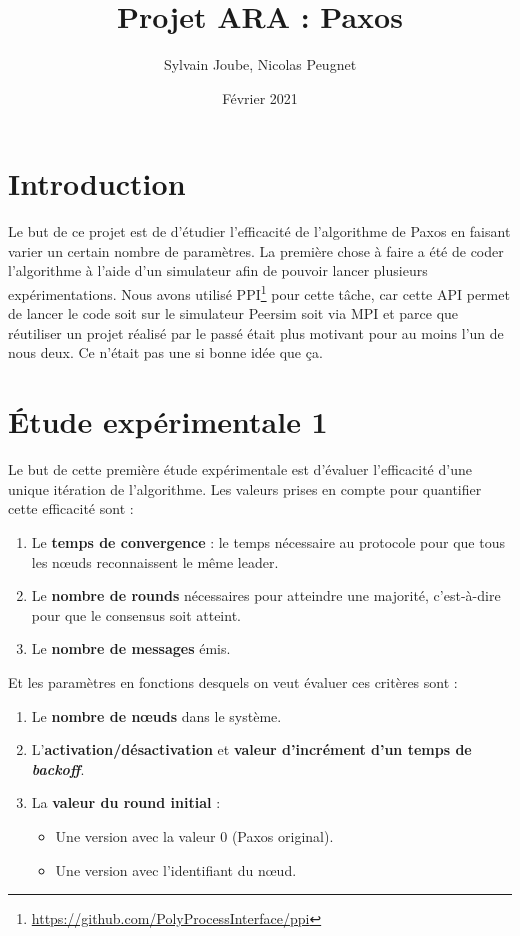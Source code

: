\documentclass[french]{article}
\title{Projet ARA : Paxos}
\date{Février 2021}
\author{Sylvain Joube, Nicolas Peugnet}
\begin{document}
\maketitle

\tableofcontents

\section*{Introduction}

Le but de ce projet est de d'étudier l'efficacité de l'algorithme de Paxos en faisant varier un certain nombre de paramètres.
La première chose à faire a été de coder l'algorithme à l'aide d'un simulateur afin de pouvoir lancer plusieurs expérimentations.
Nous avons utilisé PPI\footnote{\url{https://github.com/PolyProcessInterface/ppi}} pour cette tâche,
car cette API permet de lancer le code soit sur le simulateur Peersim soit via MPI et parce que réutiliser un projet réalisé par le passé était plus motivant pour au moins l'un de nous deux.
Ce n'était pas une si bonne idée que ça.

\section{Étude expérimentale 1}

Le but de cette première étude expérimentale est d'évaluer l'efficacité d'une unique itération de l'algorithme.
Les valeurs prises en compte pour quantifier cette efficacité sont :

\begin{enumerate}
	\item Le \textbf{temps de convergence} : le temps nécessaire au protocole pour que tous les nœuds reconnaissent le même leader.
	\item Le \textbf{nombre de rounds} nécessaires pour atteindre une majorité, c’est-à-dire pour que le consensus soit atteint.
	\item Le \textbf{nombre de messages} émis.
\end{enumerate}

Et les paramètres en fonctions desquels on veut évaluer ces critères sont :

\begin{enumerate}
	\item Le \textbf{nombre de nœuds} dans le système.
	\item L'\textbf{activation/désactivation} et \textbf{valeur d'incrément d’un temps de \emph{backoff}}.
	\item La \textbf{valeur du round initial} :
	\begin{itemize}
		\item Une version avec la valeur 0 (Paxos original).
		\item Une version avec l’identifiant du nœud.
	\end{itemize}
\end{enumerate}
\end{document}
